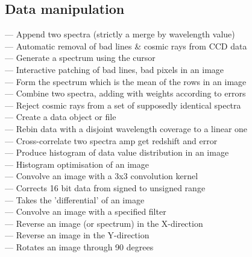 
\subsection{\label{classifmanip}Data manipulation}

 --- Append two spectra (strictly a merge by wavelength value)\\
 --- Automatic removal of bad lines \& cosmic rays from CCD data\\
 --- Generate a spectrum using the cursor\\
 --- Interactive patching of bad lines, bad pixels in an image\\
 --- Form the spectrum which is the mean of the rows in an image\\
 --- Combine two spectra, adding with weights according to errors\\
 --- Reject cosmic rays from a set of supposedly identical spectra\\
 --- Create a data object or file\\
 --- Rebin data with a disjoint wavelength coverage to a linear one\\
 --- Cross-correlate two spectra amp get redshift and error\\
 --- Produce histogram of data value distribution in an image\\
 --- Histogram optimisation of an image\\
 --- Convolve an image with a 3x3 convolution kernel\\
 --- Corrects 16 bit data from signed to unsigned range\\
 --- Takes the 'differential' of an image\\
 --- Convolve an image with a specified filter\\
 --- Reverse an image (or spectrum) in the X-direction\\
 --- Reverse an image in the Y-direction\\
 --- Rotates an image through 90 degrees\\
